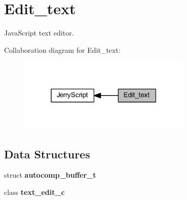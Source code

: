 \section{Edit\+\_\+text}
\label{group___edit__text}


Java\+Script text editor.  


Collaboration diagram for Edit\+\_\+text\+:
\nopagebreak
\begin{figure}[H]
\begin{center}
\leavevmode
\includegraphics[width=235pt]{group___edit__text}
\end{center}
\end{figure}
\subsection*{Data Structures}
\begin{DoxyCompactItemize}
\item 
struct \textbf{ autocomp\+\_\+buffer\+\_\+t}
\item 
class \textbf{ text\+\_\+edit\+\_\+c}
\end{DoxyCompactItemize}
